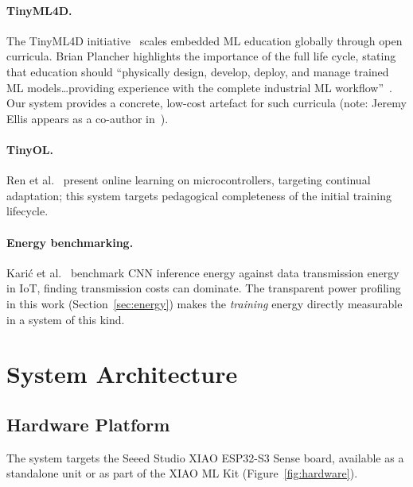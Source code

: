 \documentclass[12pt]{article}
\begin{document}
\paragraph{TinyML4D.}
The TinyML4D initiative~\cite{plancher2024tinyml4d} scales embedded ML education
globally through open curricula.
Brian Plancher highlights the importance of the full life cycle, stating that
education should ``physically design, develop, deploy, and manage trained ML
models\ldots providing experience with the complete industrial ML
workflow''~\cite{plancher2024tinyml4d}.
Our system provides a concrete, low-cost artefact for such curricula
(note: Jeremy Ellis appears as a co-author in~\cite{plancher2024tinyml4d}).

\paragraph{TinyOL.}
Ren et al.~\cite{ren2021tinyol} present online learning on microcontrollers,
targeting continual adaptation; this system targets pedagogical completeness of
the initial training lifecycle.

\paragraph{Energy benchmarking.}
Kari\'{c} et al.~\cite{karic2025send} benchmark CNN inference energy against data
transmission energy in IoT, finding transmission costs can dominate.
The transparent power profiling in this work (Section~\ref{sec:energy}) makes the
\emph{training} energy directly measurable in a system of this kind.

\section{System Architecture}
\label{sec:architecture}

\subsection{Hardware Platform}
\label{subsec:hardware}

The system targets the Seeed Studio XIAO ESP32-S3 Sense board, available as a
standalone unit or as part of the XIAO ML Kit (Figure~\ref{fig:hardware}).
\end{document}

